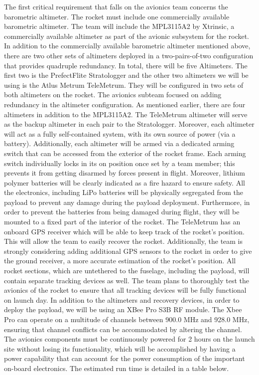 The first critical requirement that falls on the avionics team concerns the barometric altimeter. The rocket must include one commercially available barometric altimeter. The team will include the MPL3115A2 by Xtrinsic, a commercially available altimeter as part of the avionic subsystem for the rocket. 
In addition to the commercially available barometric altimeter mentioned above, there are two other sets of altimeters deployed in a two-pairs-of-two configuration that provides quadruple redundancy. In total, there will be five Altimeters. The first two is the PrefectFlite Stratologger and the other two altimeters we will be using is the Atlus Metrum TeleMetrum. They will be configured in two sets of both altimeters on the rocket. The avionics subteam focused on adding redundancy in the altimeter configuration. As mentioned earlier, there are four altimeters in addition to the  MPL3115A2. The TeleMetrum altimeter will serve as the backup altimeter in each pair to the Stratologger. Moreover, each altimeter will act as a fully self-contained system, with its own source of power (via a battery). Additionally, each altimeter will be armed via a dedicated arming switch that can be accessed from the exterior of the rocket frame. Each arming switch individually locks in its on position once set by a team member; this prevents it from getting disarmed by forces present in flight. Moreover, lithium polymer batteries will be clearly indicated as a fire hazard to ensure safety. All the electronics, including LiPo batteries will be physically segregated from the payload to prevent any damage during the payload deployment. Furthermore, in order to prevent the batteries from being damaged during flight, they will be mounted to a fixed part of the interior of the rocket. 
The TeleMetrum has an onboard GPS receiver which will be able to keep track of the rocket’s position. This will allow the team to easily recover the rocket. Additionally, the team is strongly considering adding additional GPS sensors to the rocket in order to give the ground receiver, a more accurate estimation of the rocket’s position. All rocket sections, which are untethered to the fuselage, including the payload, will contain separate tracking devices as well. The team plans to thoroughly test the avionics of the rocket to ensure that all tracking devices will be fully functional on launch day.
In addition to the altimeters and recovery devices, in order to deploy the payload, we will be using an XBee Pro S3B RF module. The Xbee Pro can operate on a multitude of channels between 900.0 MHz and 928.0 MHz, ensuring that channel conflicts can be accommodated by altering the channel. The avionics components must be continuously powered for 2 hours on the launch site without losing its functionality, which will be accomplished by having a power capability that can account for the power consumption of the important on-board electronics. The estimated run time is detailed in a table below.
